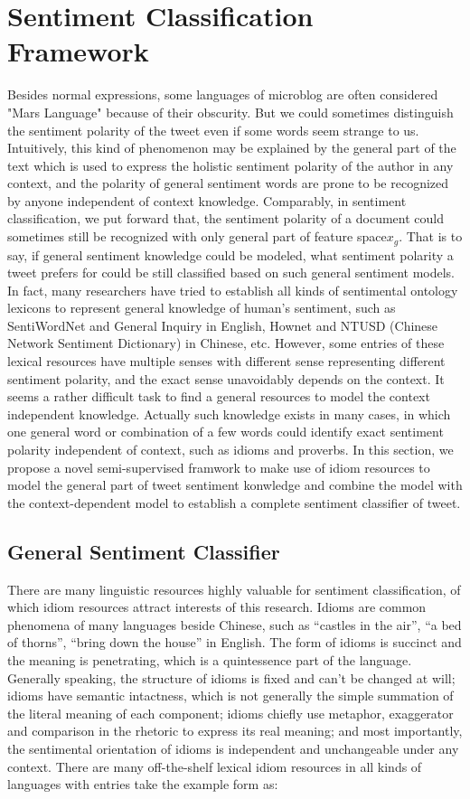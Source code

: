 \documentclass{llncs}
\begin{document}
\section{Sentiment Classification Framework}
Besides normal expressions, some languages of microblog are often considered "Mars Language" because of their obscurity. 
But we could sometimes distinguish the sentiment polarity of the tweet even if some words seem strange to us.
Intuitively, this kind of phenomenon may be explained by the general part of the text which is used to express the holistic sentiment polarity of the author in any context, and the polarity of general sentiment words are prone to be recognized by anyone independent of context knowledge. 
Comparably, in sentiment classification, we put forward that, the sentiment polarity of a document could sometimes still be recognized with only general part of feature space$ x_{g} $. 
That is to say, if general sentiment knowledge could be modeled, what sentiment polarity a tweet prefers for could be still classified based on such general sentiment models.\\
In fact, many researchers have tried to establish all kinds of sentimental ontology lexicons to represent general knowledge of human’s sentiment, such as SentiWordNet\cite{xsongx:b17} and General Inquiry\cite{xsongx:b18} in English, Hownet\cite{xsongx:b19} and NTUSD (Chinese Network Sentiment Dictionary) in Chinese\cite{xsongx:b20}, etc. 
However, some entries of these lexical resources have multiple senses with different sense representing different sentiment polarity, and the exact sense unavoidably depends on the context.
It seems a rather difficult task to find a general resources to model the context independent knowledge.
Actually such knowledge exists in many cases, in which one general word or combination of a few words could identify exact sentiment polarity independent of context, such as idioms and proverbs. 
In this section, we propose a novel semi-supervised framwork to make use of idiom resources to model the general part of tweet sentiment konwledge and combine the model with 
the context-dependent model to establish a complete sentiment classifier of tweet.
\subsection{General Sentiment Classifier}
There are many linguistic resources highly valuable for sentiment classification, of which idiom resources attract interests of this research. 
Idioms are common phenomena of many languages beside Chinese, such as “castles in the air”, “a bed of thorns”, “bring down the house” in English.
The form of idioms is succinct and the meaning is penetrating, which is a quintessence part of the language. 
Generally speaking, the structure of idioms is fixed and can’t be changed at will; 
idioms have semantic intactness, which is not generally the simple summation of the literal meaning of each component;
idioms chiefly use metaphor, exaggerator and comparison in the rhetoric to express its real meaning;
and most importantly, the sentimental orientation of idioms is independent and unchangeable under any context. 
There are many off-the-shelf lexical idiom resources in all kinds of languages with entries take the example form as:
\end{document}
